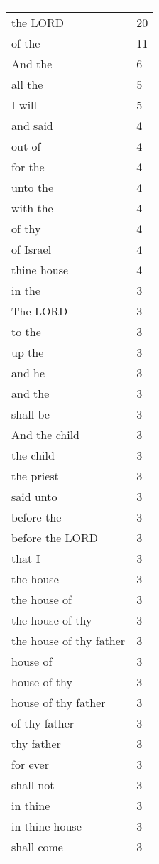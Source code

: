 \begin{center}
\begin{longtable}{|p{3.0in}|p{0.5in}|}
\hline \multicolumn{2}{c}{{ }} \\ \hline
\endfoot 
the LORD & 20\\ \hline 
of the & 11\\ \hline 
And the & 6\\ \hline 
all the & 5\\ \hline 
I will & 5\\ \hline 
and said & 4\\ \hline 
out of & 4\\ \hline 
for the & 4\\ \hline 
unto the & 4\\ \hline 
with the & 4\\ \hline 
of thy & 4\\ \hline 
of Israel & 4\\ \hline 
thine house & 4\\ \hline 
in the & 3\\ \hline 
The LORD & 3\\ \hline 
to the & 3\\ \hline 
up the & 3\\ \hline 
and he & 3\\ \hline 
and the & 3\\ \hline 
shall be & 3\\ \hline 
And the child & 3\\ \hline 
the child & 3\\ \hline 
the priest & 3\\ \hline 
said unto & 3\\ \hline 
before the & 3\\ \hline 
before the LORD & 3\\ \hline 
that I & 3\\ \hline 
the house & 3\\ \hline 
the house of & 3\\ \hline 
the house of thy & 3\\ \hline 
the house of thy father & 3\\ \hline 
house of & 3\\ \hline 
house of thy & 3\\ \hline 
house of thy father & 3\\ \hline 
of thy father & 3\\ \hline 
thy father & 3\\ \hline 
for ever & 3\\ \hline 
shall not & 3\\ \hline 
in thine & 3\\ \hline 
in thine house & 3\\ \hline 
shall come & 3\\ \hline 
\end{longtable}
\end{center}





